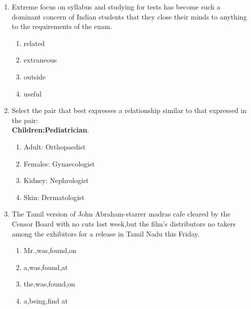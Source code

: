 \documentclass[journal]{IEEEtran}
\begin{document}
\begin{enumerate}

    \item Extreme focus on syllabus and studying for tests has become such a dominant concern of Indian students that they close their minds to anything \underline{\hspace{1cm}} to the requirements of the exam.
    \begin{multicols}{4}
     
    \begin{enumerate}
        \item related
        \item extraneous
        \item outside
        \item useful
    \end{enumerate}
   \end{multicols}

    \item Select the pair that best expresses a relationship similar to that expressed in the pair:\\
    
    \textbf{Children:Pediatrician}.
     \begin{multicols}{2}
    \begin{enumerate}
        \item Adult: Orthopaedist
        \item Females: Gynaecologist
        \item Kidney: Nephrologist
        \item Skin: Dermatologist
    \end{enumerate}
      \end{multicols}


\item The Tamil version of \underline{\hspace{1cm}} John Abraham-starrer madras cafe \underline{\hspace{1cm}} cleared by the Censor Board with no cuts last week,but the film's distributors  \underline{\hspace{1cm}} no takers among the exhibitors for a release in Tamil Nadu \underline{\hspace{1cm}} this Friday.
 \begin{multicols}{2}
        \begin{enumerate}
            
        \item Mr.,was,found,on
        \item a,was,found,at
        \item the,was,found,on
        \item a,being,find at
        \end{enumerate}
      \end{multicols}


\end{enumerate}
\end{document}

